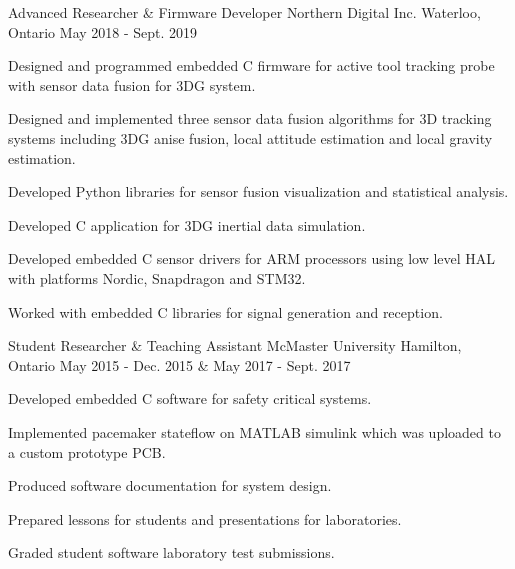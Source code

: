 
\begin{cventries}

  \cventry
    {Advanced Researcher \& Firmware Developer} %
    {Northern Digital Inc.} %
    {Waterloo, Ontario} %
    {May 2018 - Sept. 2019} %
    {
      \begin{cvitems} %
        \item {Designed and programmed embedded C firmware for active tool tracking probe with sensor data fusion for 3DG system.}
        \item {Designed and implemented three sensor data fusion algorithms for 3D tracking systems including 3DG anise fusion, local attitude estimation and local gravity estimation.}
        \item {Developed Python libraries for sensor fusion visualization and statistical analysis.}
        \item {Developed C application for 3DG inertial data simulation.}
        \item {Developed embedded C sensor drivers for ARM processors using low level HAL with platforms Nordic, Snapdragon and STM32.}
        \item {Worked with embedded C libraries for signal generation and reception.}
      \end{cvitems}
    }

  \cventry
    {Student Researcher \& Teaching Assistant} %
    {McMaster University} %
    {Hamilton, Ontario} %
    {May 2015 - Dec. 2015 \& May 2017 - Sept. 2017} %
    {
      \begin{cvitems} %
        \item {Developed embedded C software for safety critical systems.}
        \item {Implemented pacemaker stateflow on MATLAB simulink which was uploaded to a custom prototype PCB.}
        \item {Produced software documentation for system design.}
        \item {Prepared lessons for students and presentations for laboratories.}
        \item {Graded student software laboratory test submissions.}
      \end{cvitems}
    }


\end{cventries}
